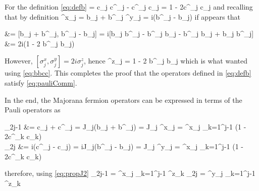 		For the definition \eqref{eq:defb}
		\be [b_j, b^\dagger_j] = c_j c^\dagger_j - c^\dagger_j c_j = 1 - 2c^\dagger_j c_j \ee
		and recalling that by definition
		\be \sigma^x_j = b_j + b^\dagger_j  \sigma^y_j = i(b^\dagger_j - b_j) \ee
		if appears that
		\be \begin{split}  &= [b_j + b^\dagger_j, b^\dagger_j - b_j] = i[b_j b^\dagger_j - b^\dagger_j b_j - b^\dagger_j b_j + b_j b^\dagger_j] \\ &= 2i(1 - 2 b^\dagger_j b_j) \end{split} \ee
		However, $[\sigma^x_j,  \sigma^y_j]=2i\sigma^z_j$, hence
		\be \sigma^z_j = 1 - 2 b^\dagger_j b_j \ee
		which is what wanted using \eqref{eq:bbcc}. This completes the proof that the operators defined in \eqref{eq:defb} satisfy \eqref{eq:pauliComm}.

		In the end, the Majorana fermion operators can be expressed in terms of the Pauli operators as
		\be \begin{split} \gamma_{2j-1} &= c_j + c^\dagger_j = J_j(b_j + b^\dagger_j) = J_j \sigma^x_j = \textstyle \sigma^x_j \prod_{k=1}^{j-1} (1 - 2c^\dagger_k c_k) \\ \gamma_{2j} &= i(c^\dagger_j - c_j) = iJ_j(b^\dagger_j - b_j) = J_j \sigma^y_j = \textstyle \sigma^x_j \prod_{k=1}^{j-1} (1 - 2c^\dagger_k c_k) \end{split} \ee
		therefore, using \eqref{eq:propJ2}
		\be \gamma_{2j-1} = \sigma^x_j \prod_{k=1}^{j-1} \sigma^z_k  \gamma_{2j} = \sigma^y_j \prod_{k=1}^{j-1} \sigma^z_k \ee

